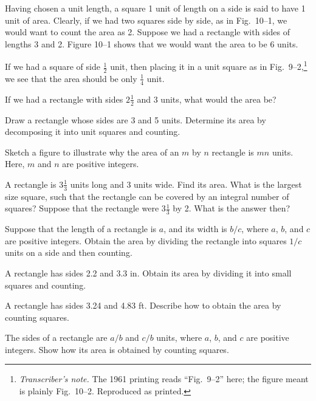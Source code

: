 \documentclass[11pt]{book}
\begin{document}
Having chosen a unit length, a square 1 unit of length on a side is said to
have 1 unit of area. Clearly, if we had two squares side by side, as in
Fig.~10--1, we would want to count the area as 2. Suppose we had a rectangle
with sides of lengths 3 and 2. Figure 10--1 shows that we would want the area
to be 6 units.

If we had a square of side $\tfrac{1}{2}$ unit, then placing it in a unit
square as in Fig.~9--2,\footnote{\emph{Transcriber's note.} The 1961 printing
reads ``Fig.~9--2'' here; the figure meant is plainly Fig.~10--2. Reproduced
as printed.} we see that the area should be only $\tfrac{1}{4}$ unit.

If we had a rectangle with sides $2\tfrac{1}{2}$ and 3 units, what would the
area be?

\FIGXONETWO

\begin{exercisecols}
\begin{exlist}
\item Draw a rectangle whose sides are 3 and 5 units. Determine its area by
  decomposing it into unit squares and counting.
\item Sketch a figure to illustrate why the area of an $m$ by $n$ rectangle is
  $mn$ units. Here, $m$ and $n$ are positive integers.
\item A rectangle is $3\tfrac{1}{3}$ units long and 3 units wide. Find its
  area. What is the largest size square, such that the rectangle can be
  covered by an integral number of squares? Suppose that the rectangle were
  $3\tfrac{1}{3}$ by 2. What is the answer then?
\item[\stex 4.] Suppose that the length of a rectangle is $a$, and its width
  is $b/c$, where $a$, $b$, and $c$ are positive integers. Obtain the area by
  dividing the rectangle into squares $1/c$ units on a side and then counting.
\item[5.] A rectangle has sides 2.2 and 3.3 in. Obtain its area by dividing it
  into small squares and counting.
\item[6.] A rectangle has sides 3.24 and 4.83 ft. Describe how to obtain the
  area by counting squares.
\item[\stex 7.] The sides of a rectangle are $a/b$ and $c/b$ units, where $a$,
  $b$, and $c$ are positive integers. Show how its area is obtained by counting
  squares.
\end{exlist}
\end{exercisecols}
\end{document}
